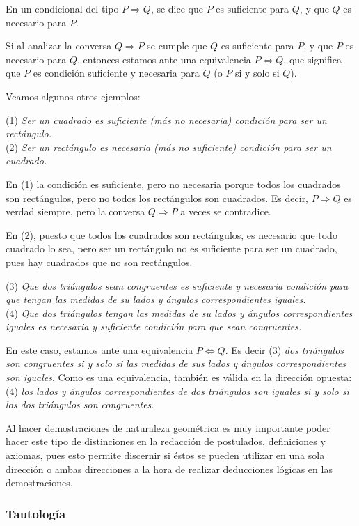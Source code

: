 En un condicional del tipo $P \Rightarrow Q$, se dice que $P$ es suficiente para $Q$, y que $Q$ es necesario para $P$.

Si al analizar la conversa $Q \Rightarrow P$ se cumple que $Q$ es suficiente para $P$, y que $P$ es necesario para $Q$, entonces estamos ante una equivalencia $P \Leftrightarrow Q$, que significa que $P$ es condición suficiente y necesaria para $Q$ (o $P$ si y solo si $Q$).

Veamos algunos otros ejemplos:

(1) \textit{Ser un cuadrado es suficiente (más no necesaria) condición para ser un rectángulo.} \\
(2) \textit{Ser un rectángulo es necesaria (más no suficiente) condición para ser un cuadrado. }

En (1) la condición es suficiente, pero no necesaria porque todos los cuadrados son rectángulos, pero no todos los rectángulos son cuadrados. Es decir, $P \Rightarrow Q$ es verdad siempre, pero la conversa $Q \Rightarrow P$ a veces se contradice.

En (2), puesto que todos los cuadrados son rectángulos, es necesario que todo cuadrado lo sea, pero ser un rectángulo no es suficiente para ser un cuadrado, pues hay cuadrados que no son rectángulos.

(3) \textit{Que dos triángulos sean congruentes es suficiente y necesaria condición para que tengan las medidas de su lados y ángulos correspondientes iguales.} \\
(4) \textit{Que dos triángulos tengan las medidas de su lados y ángulos correspondientes iguales es necesaria y suficiente condición para que sean congruentes.}

En este caso, estamos ante una equivalencia $P \Leftrightarrow Q$. Es decir (3) \textit{dos triángulos son congruentes si y solo si las medidas de sus lados y ángulos correspondientes son iguales}. Como es una equivalencia, también es válida en la dirección opuesta: (4) \textit{los lados y ángulos correspondientes de dos triángulos son iguales si y solo si los dos triángulos son congruentes}. 

Al hacer demostraciones de naturaleza geométrica es muy importante poder hacer este tipo de distinciones en la redacción de postulados, definiciones y axiomas, pues esto permite discernir si éstos se pueden utilizar en una sola dirección o ambas direcciones a la hora de realizar deducciones lógicas en las demostraciones.

\subsubsection{Tautología}

